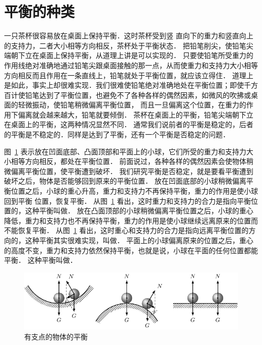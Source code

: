 \section{平衡的种类}
一只茶杯很容易放在桌面上保持平衡．这时茶杯受到竖
直向下的重力和竖直向上的支持力，二者大小相等方向相反，茶杯处于平衡状态．
把铅笔削尖，使铅笔尖端朝下立在桌面上保持平衡，从道理上讲是可以实现的．
只要使铅笔所受重力的作用线绝对准确地通过铅笔尖跟桌面接触的那一点，从而使重力和支持力大小相等方向相反而且作用在一条直线上，铅笔就处于平衡位置，就应该立得住．
道理上是如此，事实上却很难实现．我们很难使铅笔绝对准确地处在平衡位置；即使千方百计使铅笔达到了平衡位置，也避免不了各种各样的偶然因素，如微风的吹拂或桌面的轻微振动，使铅笔稍微偏离平衡位置，
而且一旦偏离这个位置，在重力的作用下偏离就会越来越大，铅笔就要倾倒．
茶杯在桌面上的平衡，铅笔尖端朝下立在桌面上的平衡，这两种情况显然不同．
通常我们说前者的平衡是稳定的，后者的平衡是不稳定的．同样是达到了平衡，还有一个平衡是否稳定的问题．


图~\ref{fig_A_6-16} 表示放在凹面底部、凸面顶部和平面上的小球，它们所受的重力和支持力大小相等方向相反，都处在平衡位置．
前面说过，各种各样的偶然因素会使物体稍微偏离平衡位置，使平衡遭到破坏．
我们研究平衡是否稳定，就是要看平衡遭到破坏之后，物体是否能够回到原来的平衡位置．
放在凹面底部的小球稍微偏离平衡位置之后，小球的重心升高，重力和支持力不再保持平衡，重力的作用是使小球回到平衡
位置，恢复平衡．
从图~\ref{fig_A_6-16} 看出，这时重力和支持力的合力是指向平衡位置的，这种平衡叫做．
放在凸面顶部的小球稍微偏离平衡位置之后，小球的重心降低，重力和支持力也不再保持平衡，重力的作用是使小球继续远离原来的位置而不能恢复平衡．
从图~\ref{fig_A_6-16} 看出，这时重心和支持力的合力是指向远离平衡位置的方向的，这种平衡其实很难实现，叫做．
平面上的小球偏离原来的位置之后，重心的高度不变，重力和支持力依然保持平衡，也就是说，小球在平面的任何位置都能平衡．
这种平衡叫做．
\begin{figure}[htbp]
	\centering
	\includegraphics{fig/A/6-16.pdf}
	\caption{有支点的物体的平衡}\label{fig_A_6-16}
\end{figure}



